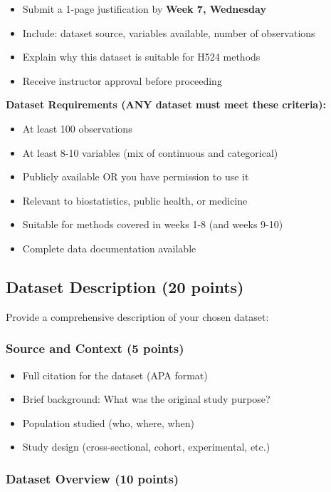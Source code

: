\documentclass[11pt]{article}
\begin{document}
\begin{itemize}
\item Submit a 1-page justification by \textbf{Week 7, Wednesday}
\item Include: dataset source, variables available, number of observations
\item Explain why this dataset is suitable for H524 methods
\item Receive instructor approval before proceeding
\end{itemize}

\textbf{Dataset Requirements (ANY dataset must meet these criteria):}
\begin{itemize}
\item At least 100 observations
\item At least 8-10 variables (mix of continuous and categorical)
\item Publicly available OR you have permission to use it
\item Relevant to biostatistics, public health, or medicine
\item Suitable for methods covered in weeks 1-8 (and weeks 9-10)
\item Complete data documentation available
\end{itemize}

\subsection{Dataset Description (20 points)}

Provide a comprehensive description of your chosen dataset:

\subsubsection{Source and Context (5 points)}

\begin{itemize}
\item Full citation for the dataset (APA format)
\item Brief background: What was the original study purpose?
\item Population studied (who, where, when)
\item Study design (cross-sectional, cohort, experimental, etc.)
\end{itemize}

\subsubsection{Dataset Overview (10 points)}
\end{document}
